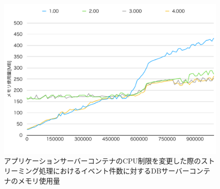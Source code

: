 \documentclass[../../../../../main]{subfiles}
\begin{document}
    \begin{figure}[H]
        \centering
        \includegraphics[width=12cm]{graph}
        \caption{アプリケーションサーバーコンテナのCPU制限を変更した際のストリーミング処理におけるイベント件数に対するDBサーバーコンテナのメモリ使用量}
        \label{fig:stream-change-app-cpu-limit-db-memory-app_1024-db_1_1024}
    \end{figure}
\end{document}
